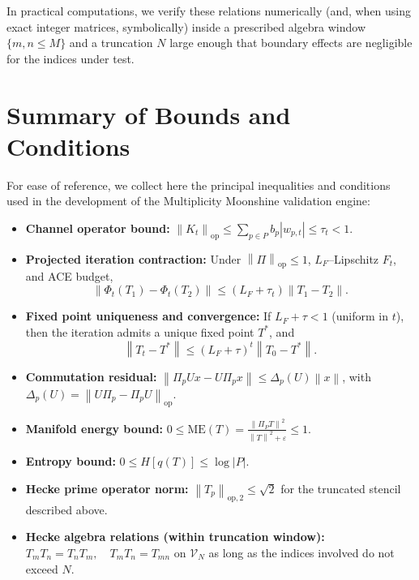 \documentclass[11pt]{article}
\theoremstyle{definition}
\theoremstyle{plain}
\theoremstyle{remark}
\newcommand{\Vcal}{\mathcal{V}}
\newcommand{\norm}[1]{\left\lVert #1 \right\rVert}
\begin{document}
In practical computations, we verify these relations numerically (and, when using exact integer matrices, symbolically) inside a prescribed algebra window \(\{m,n \le M\}\) and a truncation \(N\) large enough that boundary effects are negligible for the indices under test.

\section{Summary of Bounds and Conditions}

For ease of reference, we collect here the principal inequalities and conditions used in the development of the Multiplicity Moonshine validation engine:

\begin{itemize}
  \item \textbf{Channel operator bound:}
  \(\displaystyle \norm{K_t}_{\mathrm{op}} \le \sum_{p\in P} b_p |w_{p,t}| \le \tau_t < 1.\)

  \item \textbf{Projected iteration contraction:}
  Under \(\norm{\Pi}_{\mathrm{op}}\le 1\), \(L_F\)–Lipschitz \(F_t\), and ACE budget,
  \[
    \norm{\Phi_t(T_1) - \Phi_t(T_2)} \le (L_F + \tau_t)\norm{T_1 - T_2}.
  \]

  \item \textbf{Fixed point uniqueness and convergence:}
  If \(L_F + \tau < 1\) (uniform in \(t\)), then the iteration admits a unique fixed point \(T^*\), and
  \[
    \norm{T_t - T^*} \le (L_F + \tau)^t \norm{T_0 - T^*}.
  \]

  \item \textbf{Commutation residual:}
  \(\displaystyle \norm{\Pi_p U x - U \Pi_p x} \le \Delta_p(U)\norm{x}\), with
  \(\Delta_p(U) = \norm{U\Pi_p - \Pi_p U}_{\mathrm{op}}\).

  \item \textbf{Manifold energy bound:}
  \(\displaystyle 0 \le \mathrm{ME}(T) = \frac{\norm{\Pi_P T}^2}{\norm{T}^2 + \varepsilon} \le 1.\)

  \item \textbf{Entropy bound:}
  \(\displaystyle 0 \le H[q(T)] \le \log |P|\).

  \item \textbf{Hecke prime operator norm:}
  \(\displaystyle \norm{T_p}_{\mathrm{op},2} \le \sqrt{2}\) for the truncated stencil described above.

  \item \textbf{Hecke algebra relations (within truncation window):}
  \(\displaystyle T_m T_n = T_n T_m,\quad T_m T_n = T_{mn}\) on \(\Vcal_N\) as long as the indices involved do not exceed \(N\).
\end{itemize}
\end{document}
